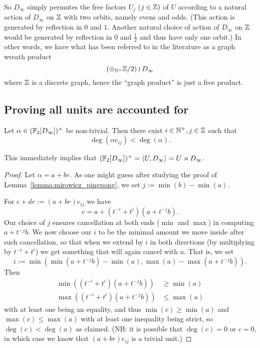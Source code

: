 So $D_\infty$ simply permutes the free factors $U_j$ ($j \in \mathbb{Z})$ of $U$ according to a natural action of $D_\infty$ on $\mathbb{Z}$ with two orbits, namely evens and odds.
(This action is generated by reflection in $0$ and $1$.
Another natural choice of action of $D_\infty$ on $\mathbb{Z}$ would be generated by reflection in $0$ and $\frac{1}{2}$ and thus have only one orbit.)
In other words, we have what has been referred to in the literature as a graph wreath product \[
    (\oplus_{\mathbb{N}^+} \mathbb{Z}/2) \wr D_\infty
\] where $\mathbb{Z}$ is a discrete graph, hence the ``graph product'' is just a free product.

\subsection*{Proving all units are accounted for}

\begin{lemma}
    Let $\alpha \in (\mathbb{F}_2[D_\infty])^\times$ be non-trivial.
    Then there exist $i \in \mathbb{N}^+, j \in \mathbb{Z}$ such that \[
        \deg(\alpha e_{ij}) < \deg(\alpha).
    \]
\end{lemma}

This immediately implies that $(\mathbb{F}_2[D_\infty])^\times = \langle U, D_\infty \rangle = U \rtimes D_\infty$.

\begin{proof}
    Let $\alpha = a + br$.
    As one might guess after studying the proof of Lemma~\ref{lemma:mirowicz_pingpong}, we set $j := \min(b) - \min(a)$.

    For $c + dr := (a + br) e_{ij}$ we have \[
        c = a + (t^{-i} + t^{i})(a + t^{-j} b).
    \]
    Our choice of $j$ ensures cancellation at both ends ($\min$ and $\max$) in computing $a + t^{-j} b$.
    We now choose our $i$ to be the minimal amount we move inside after such cancellation, so that when we extend by $i$ in both directions (by multiplying by $t^{-i} + t^i$) we get something that will again cancel with $a$.
    That is, we set \[
        i := \min\left(\min(a + t^{-j}b) - \min(a), \max(a) - \max(a + t^{-j}b)\right).
    \]
    Then
    \begin{align*}
        \min \left( (t^{-i} + t^{i})(a + t^{-j}b) \right) &\geq \min(a) \\
        \max \left( (t^{-i} + t^{i})(a + t^{-j}b) \right) &\leq \max(a)
    \end{align*}
    with at least one being an equality, and thus $\min(c) \geq \min(a)$ and $\max(c) \leq \max(a)$ with at least one inequality being strict, so $\deg(c) < \deg (a)$ as claimed.
    (NB: it is possible that $\deg(c) = 0$ or $c = 0$, in which case we know that $(a + br)e_{ij}$ is a trivial unit.)
\end{proof}

